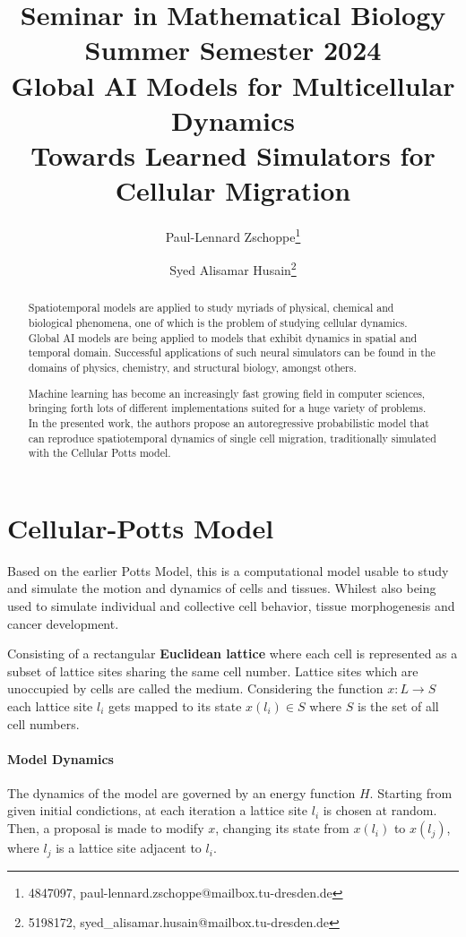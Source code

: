 \documentclass[a4paper,10pt,twocolumn]{article}
\date{}
\title{
    \small
    {\large Seminar in Mathematical Biology}\\
    Summer Semester 2024\\
    \vspace{1em}
    {\LARGE\bfseries Global AI Models for Multicellular Dynamics} \\ 
    {\Large Towards Learned Simulators for Cellular Migration}
}
\author{
    Paul-Lennard Zschoppe\footnote{4847097, paul-lennard.zschoppe@mailbox.tu-dresden.de}\\
    \and
    Syed Alisamar Husain\footnote{5198172, syed\_alisamar.husain@mailbox.tu-dresden.de}\\
}
\begin{document}
    \maketitle

    \begin{abstract}
        Spatiotemporal models are applied to study myriads of physical, chemical and biological
        phenomena, one of which is the problem of studying cellular dynamics.
        Global AI models are being applied to models that exhibit dynamics in spatial 
        and temporal domain. Successful applications of such neural simulators can be found in the 
        domains of physics, chemistry, and structural biology, amongst others. 

        Machine learning has become an increasingly fast growing field in computer sciences,
        bringing forth lots of different implementations suited for a huge variety of problems.
        In the presented work, the authors propose an autoregressive probabilistic model that can reproduce 
        spatiotemporal dynamics of single cell migration, traditionally simulated with the 
        Cellular Potts model. 
    \end{abstract}



    \section{Cellular-Potts Model}
        Based on the earlier Potts Model, this is a computational model usable to study and simulate
        the motion and dynamics of cells and tissues. Whilest also being used to simulate 
        individual and collective cell behavior, tissue morphogenesis and cancer development.
        
        Consisting of a rectangular {\bfseries Euclidean lattice} where each cell is represented as a subset 
        of lattice sites sharing the same cell number. Lattice sites which are unoccupied by 
        cells are called the medium. 
        Considering the function $x: L \to S$ each lattice site $l_i$ gets mapped to its state 
        $x(l_i) \in S$ where $S$ is the set of all cell numbers.

        \paragraph{Model Dynamics}
        The dynamics of the model are governed by an energy function $H$.
        Starting from given initial condictions, at each iteration a lattice site $l_i$ is chosen at random.
        Then, a proposal is made to modify $x$, changing its state from $x(l_i)$ to 
        $x(l_j)$, where $l_j$ is a lattice site adjacent to $l_i$.
\end{document}
